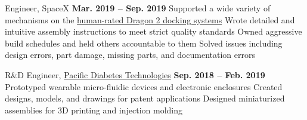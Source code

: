\begin{innerlist}
	\item Engineer, SpaceX 
		\hfill\textbf{Mar. 2019 -- Sep. 2019}
		\subitem Supported a wide variety of mechanisms on the \href{https://en.wikipedia.org/wiki/Dragon_2}{human-rated Dragon 2 docking systems}
		\subitem Wrote detailed and intuitive assembly instructions to meet strict quality standards
		\subitem Owned aggressive build schedules and held others accountable to them
		\subitem Solved issues including design errors, part damage, missing parts, and documentation errors
    \item R\&D Engineer, \href{http://pacificdt.com/}{Pacific Diabetes Technologies} 
		\hfill\textbf{Sep. 2018 -- Feb. 2019} %
        \subitem Prototyped wearable micro-fluidic devices and electronic enclosures
		\subitem Created designs, models, and drawings for patent applications
		\subitem Designed miniaturized assemblies for 3D printing and injection molding
\end{innerlist}
\vfill
